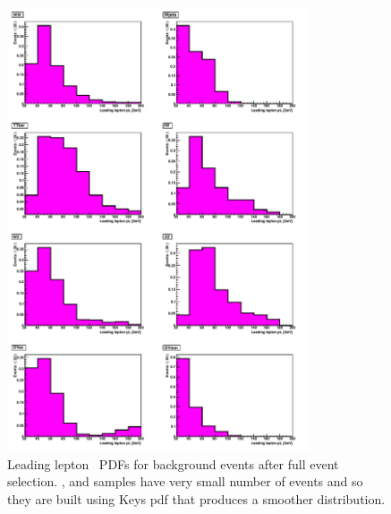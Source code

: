 \begin{figure}[tp]
  \centerline{
    \includegraphics[width=0.8\textwidth]{figures/pdf_mc_all.pdf}
  }

  \caption[Background PDFs] {Leading lepton \pt\ PDFs for background
  events after full event selection.  \wjets{},\dyee{} and \dymm{}
  samples have very small number of events and so they are built using
  Keys pdf that produces a smoother distribution.} \label{fig:bkgpdfs}
\end{figure}
